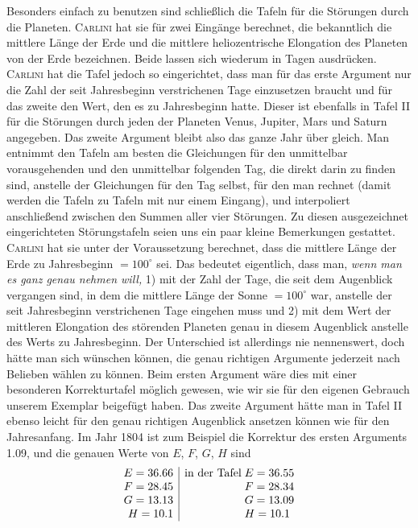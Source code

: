 Besonders einfach zu benutzen sind schließlich die Tafeln für die Störungen durch die Planeten. \textsc{Carlini} hat sie für zwei Eingänge berechnet, die bekanntlich die mittlere Länge der Erde und die mittlere heliozentrische Elongation des Planeten von der Erde bezeichnen. Beide lassen sich wiederum in Tagen ausdrücken. \textsc{Carlini} hat die Tafel jedoch so eingerichtet, dass man für das erste Argument nur die Zahl der seit Jahresbeginn verstrichenen Tage einzusetzen braucht und für das zweite den Wert, den es zu Jahresbeginn hatte. Dieser ist ebenfalls in Tafel II für die Störungen durch jeden der Planeten Venus, Jupiter, Mars und Saturn angegeben. Das zweite Argument bleibt also das ganze Jahr über gleich. Man entnimmt den Tafeln am besten die Gleichungen für den unmittelbar vorausgehenden und den unmittelbar folgenden Tag, die direkt darin zu finden sind, anstelle der Gleichungen für den Tag selbst, für den man rechnet (damit werden die Tafeln zu Tafeln mit nur einem Eingang), und interpoliert anschließend zwischen den Summen aller vier Störungen. Zu diesen ausgezeichnet eingerichteten Störungstafeln seien uns ein paar kleine Bemerkungen gestattet. \textsc{Carlini} hat sie unter der Voraussetzung berechnet, dass die mittlere Länge der Erde zu Jahresbeginn $= 100^\circ$ sei. Das bedeutet eigentlich, dass man, \emph{wenn man es ganz genau nehmen will,} 1) mit der Zahl der Tage, die seit dem Augenblick vergangen sind, in dem die mittlere Länge der Sonne $= 100^\circ$ war, anstelle der seit Jahresbeginn verstrichenen Tage eingehen muss und 2) mit dem Wert der mittleren Elongation des störenden Planeten genau in diesem Augenblick anstelle des Werts zu Jahresbeginn. Der Unterschied ist allerdings nie nennenswert, doch hätte man sich wünschen können, die genau richtigen Argumente jederzeit nach Belieben wählen zu können. Beim ersten Argument wäre dies mit einer besonderen Korrekturtafel möglich gewesen, wie wir sie für den eigenen Gebrauch unserem Exemplar beigefügt haben. Das zweite Argument hätte man in Tafel II ebenso leicht für den genau richtigen Augenblick ansetzen können wie für den Jahresanfang. Im Jahr 1804 ist zum Beispiel die Korrektur des ersten Arguments 1.09, und die genauen Werte von $E$, $F$, $G$, $H$ sind \[ \begin{array}{r|l@{\;}l} E = 36.66 & \text{in der Tafel} & E = 36.55\\ F = 28.45 & & F = 28.34\\ G = 13.13 & & G = 13.09\\ H = 10.1 & & H = 10.1 \end{array} \]

